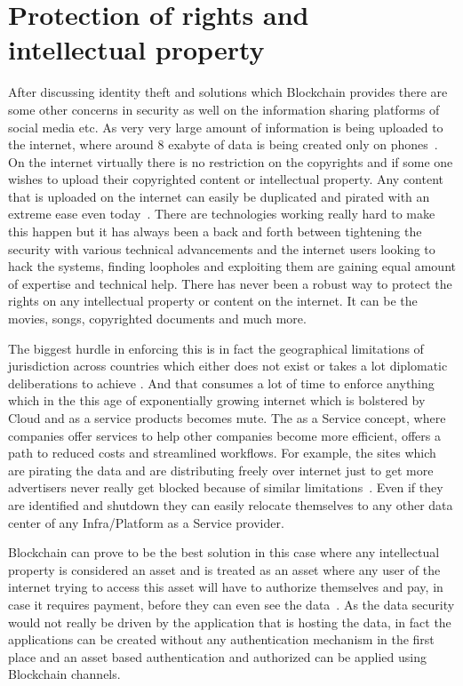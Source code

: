 \section{Protection of rights and intellectual property}

After discussing identity theft and solutions which Blockchain
provides there are some other concerns in security as well on the
information sharing platforms of social media etc. As very very large
amount of information is being uploaded to the internet, where around
8 exabyte of data is being created only on phones~\cite{jeff26}. On
the internet virtually there is no restriction on the copyrights and if
some one wishes to upload their copyrighted content or intellectual
property. Any content that is uploaded on the internet can easily be
duplicated and pirated with an extreme ease even today~\cite{anita27}.
There are technologies working really hard to make this happen but it
has always been a back and forth between tightening the security with
various technical advancements and the internet users looking to hack
the systems, finding loopholes and exploiting them are gaining equal
amount of expertise and technical help. There has never been a robust
way to protect the rights on any intellectual property or content on
the internet. It can be the movies, songs, copyrighted documents and
much more.

The biggest hurdle in enforcing this is in fact the geographical
limitations of jurisdiction across countries which either does not
exist or takes a lot diplomatic deliberations to achieve
\cite{anita27}. And that consumes a lot of time to enforce anything
which in the this age of exponentially growing internet which is
bolstered by Cloud and as a service products becomes mute. The as a
Service concept, where companies offer services to help other
companies  become more efficient, offers a path to reduced costs and
streamlined workflows. For example, the sites which are pirating the
data and are distributing freely over internet just to get more
advertisers never really get blocked because of similar
limitations~\cite{ian28}. Even if they are identified and shutdown
they can easily relocate themselves to any other data center of any
Infra/Platform as a Service provider. 

Blockchain can prove to be the best solution in this case where any
intellectual property is considered an asset and is treated as an
asset where any user of the internet trying to access this asset will
have to authorize themselves and pay, in case it requires payment,
before they can even see the data~\cite{bitcoinist29}. As the data
security would not really be driven by the application that is hosting
the data, in fact the applications can be created without any
authentication mechanism in the first place and an asset based
authentication and authorized can be applied using Blockchain
channels.


